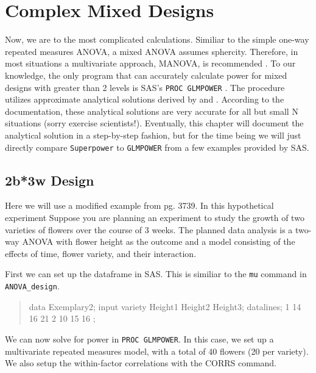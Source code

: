 \documentclass[]{book}
\begin{document}
\newpage

\hypertarget{complex-mixed-designs}{%
\section{Complex Mixed Designs}\label{complex-mixed-designs}}

Now, we are to the most complicated calculations. Similiar to the simple one-way repeated measures ANOVA, a mixed ANOVA assumes sphercity. Therefore, in most situations a multivariate approach, MANOVA, is recommended \citep{maxwell_designing_2004}. To our knowledge, the only program that can accurately calculate power for mixed designs with greater than 2 levels is SAS's \texttt{PROC\ GLMPOWER} \citep{SASglmpower}. The procedure utilizes approximate analytical solutions derived by \citet{muller1984practical} and \citet{o1999pragmatic}. According to the documentation, these analytical solutions are very accurate for all but small N situations (sorry exercise scientists!). Eventually, this chapter will document the analytical solution in a step-by-step fashion, but for the time being we will just directly compare \texttt{Superpower} to \texttt{GLMPOWER} from a few examples provided by SAS.

\hypertarget{b3w-design}{%
\subsection{2b*3w Design}\label{b3w-design}}

Here we will use a modified example from \citet{SASglmpower} pg. 3739. In this hypothetical experiment Suppose you are planning an experiment to study the growth of two varieties of flowers over the course of 3 weeks. The planned data analysis is a two-way ANOVA with flower height as the outcome and a model consisting of the effects of time, flower variety, and their interaction.

First we can set up the dataframe in SAS. This is similiar to the \texttt{mu} command in \texttt{ANOVA\_design}.

\begin{quote}
data Exemplary2;
input variety Height1 Height2 Height3;
datalines;
1 14 16 21
2 10 15 16
;
\end{quote}

We can now solve for power in \texttt{PROC\ GLMPOWER}. In this case, we set up a multivariate repeated measures model, with a total of 40 flowers (20 per variety). We also setup the within-factor correlations with the CORRS command.
\end{document}
